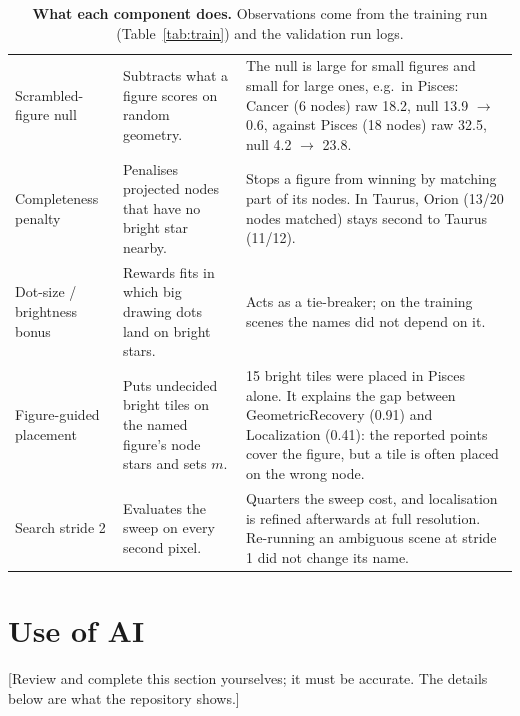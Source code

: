 \documentclass[a4paper,11pt]{article}
\newcommand{\fillin}[1]{{\color{red}[#1]}}
\begin{document}
\begin{table}[h]
\begin{tabular}{p{3.3cm}p{5.6cm}p{6.6cm}}
\addlinespace
Scrambled-figure null &
Subtracts what a figure scores on random geometry. &
The null is large for small figures and small for large ones, e.g.\ in Pisces: Cancer (6 nodes) raw 18.2, null 13.9
$\rightarrow$ 0.6, against Pisces (18 nodes) raw 32.5, null 4.2 $\rightarrow$ 23.8. \\
\addlinespace
Completeness penalty &
Penalises projected nodes that have no bright star nearby. &
Stops a figure from winning by matching part of its nodes. In Taurus, Orion (13/20 nodes matched) stays second to
Taurus (11/12). \\
\addlinespace
Dot-size / brightness bonus &
Rewards fits in which big drawing dots land on bright stars. &
Acts as a tie-breaker; on the training scenes the names did not depend on it. \\
\addlinespace
Figure-guided placement &
Puts undecided bright tiles on the named figure's node stars and sets $m$. &
15 bright tiles were placed in Pisces alone. It explains the gap between GeometricRecovery (0.91) and Localization
(0.41): the reported points cover the figure, but a tile is often placed on the wrong node. \\
\addlinespace
Search stride 2 &
Evaluates the sweep on every second pixel. &
Quarters the sweep cost, and localisation is refined afterwards at full resolution. Re-running an ambiguous scene
at stride 1 did not change its name. \\
\bottomrule
\end{tabular}
\caption{\textbf{What each component does.} Observations come from the training run (Table~\ref{tab:train}) and the
validation run logs.}
\label{tab:ablation}
\end{table}

\section{Use of AI}

\fillin{Review and complete this section yourselves; it must be accurate. The details below are what the repository shows.}
\end{document}
